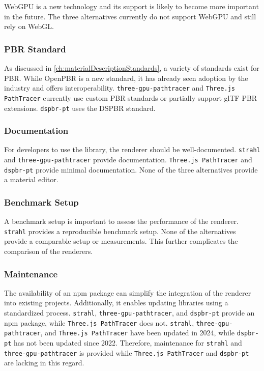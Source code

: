 \gls{WebGPU} is a new technology and its support is likely to become more important in the future. The three alternatives currently do not support \gls{WebGPU} and still rely on \gls{WebGL}.

\subsubsection*{PBR Standard}

As discussed in \autoref{ch:materialDescriptionStandards}, a variety of standards exist for \gls{PBR}. While \gls{OpenPBR} is a new standard, it has already seen adoption by the industry and offers interoperability. \texttt{three-gpu-pathtracer} and \texttt{Three.js PathTracer} currently use custom \gls{PBR} standards or partially support \gls{glTF} \gls{PBR} extensions. \texttt{dspbr-pt} uses the \gls{DSPBR} standard.

\subsubsection*{Documentation}

For developers to use the library, the renderer should be well-documented. \texttt{strahl} and \texttt{three-gpu-pathtracer} provide documentation. \texttt{Three.js PathTracer} and \texttt{dspbr-pt} provide minimal documentation. None of the three alternatives provide a material editor.

\subsubsection*{Benchmark Setup}

A benchmark setup is important to assess the performance of the renderer. \texttt{strahl} provides a reproducible benchmark setup. None of the alternatives provide a comparable setup or measurements. This further complicates the comparison of the renderers.

\subsubsection*{Maintenance}

The availability of an \gls{npm} package can simplify the integration of the renderer into existing projects. Additionally, it enables updating libraries using a standardized process. \texttt{strahl}, \texttt{three-gpu-pathtracer}, and \texttt{dspbr-pt} provide an \gls{npm} package, while \texttt{Three.js PathTracer} does not. \texttt{strahl}, \texttt{three-gpu-pathtracer}, and \texttt{Three.js PathTracer} have been updated in 2024, while \texttt{dspbr-pt} has not been updated since 2022. Therefore, maintenance for \texttt{strahl} and \texttt{three-gpu-pathtracer} is provided while \texttt{Three.js PathTracer} and \texttt{dspbr-pt} are lacking in this regard.


